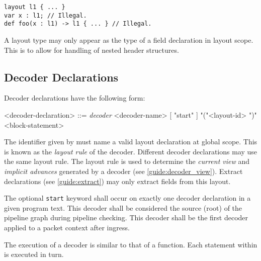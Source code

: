 \begin{minip}
\begin{lstlisting}
layout l1 { ... }
var x : l1; // Illegal.
def foo(x : l1) -> l1 { ... } // Illegal.
\end{lstlisting}
\end{minip}

A layout type may only appear as the type of a field declaration in layout scope. This is to allow for handling of nested header structures.

\subsection{Decoder Declarations} \label{guide:decoder}

Decoder declarations have the following form:

\begin{minip}
\begin{grammar}
<decoder-declaration> ::=
\textit{decoder} <decoder-name> [ "start" ]
"("<layout-id> ")" 
<block-statement>
\end{grammar}
\end{minip}

The identifier given by  must name a valid layout declaration at global scope. This  is known as the \textit{layout rule} of the decoder. Different decoder declarations may use the same layout rule. The layout rule is used to determine the \textit{current view} and \textit{implicit advances} generated by a decoder (see \ref{guide:decoder_view}). Extract declarations (see \ref{guide:extract}) may only extract fields from this layout.

The optional \texttt{start} keyword shall occur on exactly one decoder declaration in a given program text. This decoder shall be considered the source (root) of the pipeline graph during pipeline checking. This decoder shall be the first decoder applied to a packet context after ingress.

The execution of a decoder is similar to that of a function. Each statement within  is executed in turn.

